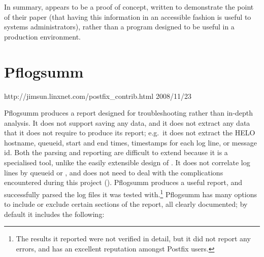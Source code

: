 In summary,  appears to be a proof of concept, written to
demonstrate the point of their paper (that having this information in an
accessible fashion is useful to systems administrators), rather than a
program designed to be useful in a production environment.

%

\section{Pflogsumm}

{http://jimsun.linxnet.com/postfix_contrib.html}
{2008/11/23}

Pflogsumm produces a report designed for troubleshooting rather than
in-depth analysis.  It does not support saving any data, and it does not
extract any data that it does not require to produce its report; e.g.\ it
does not extract the HELO hostname, queueid, start and end times,
timestamps for each log line, or message id.  Both the parsing and
reporting are difficult to extend because it is a specialised tool, unlike
the easily extensible design of \parsername{}.  It does not correlate log
lines by queueid or , and does not need to deal with the
complications encountered during this project ().
Pflogsumm produces a useful report, and successfully parsed the
\numberOFlogFILES{} log files it was tested with.\footnote{The results it
reported were not verified in detail, but it did not report any errors, and
has an excellent reputation amongst Postfix users.}  Pflogsumm has many
options to include or exclude certain sections of the report, all clearly
documented; by default it includes the following:

